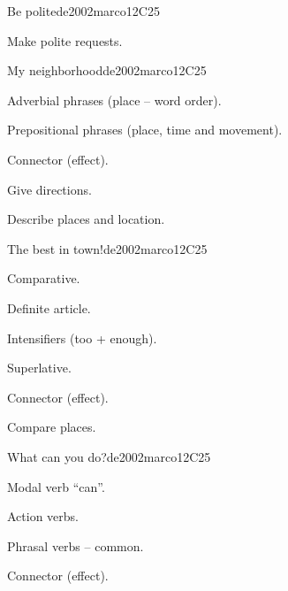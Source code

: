 \begin{syllabus}
\begin{unit}{Be polite}{}{de2002marco}{12}{C25}
   \begin{learningoutcomes}
      \item Make polite requests.
   \end{learningoutcomes}
\end{unit}

\begin{unit}{My neighborhood}{}{de2002marco}{12}{C25}
   \begin{topics}
      \item Adverbial phrases (place – word order).
      \item Prepositional phrases (place, time and movement).
      \item Connector (effect).
   \end{topics}

   \begin{learningoutcomes}
      \item Give directions.
      \item Describe places and location.
   \end{learningoutcomes}
\end{unit}

\begin{unit}{The best in town!}{}{de2002marco}{12}{C25}
   \begin{topics}
      \item Comparative.
      \item Definite article.
      \item Intensifiers (too + enough).
      \item Superlative.
      \item Connector (effect).
   \end{topics}

   \begin{learningoutcomes}
      \item Compare places.
   \end{learningoutcomes}
\end{unit}

\begin{unit}{What can you do?}{}{de2002marco}{12}{C25}
   \begin{topics}
      \item Modal verb “can”.
      \item Action verbs.
      \item Phrasal verbs – common.
      \item Connector (effect).
   \end{topics}


\end{unit}
\end{syllabus}
